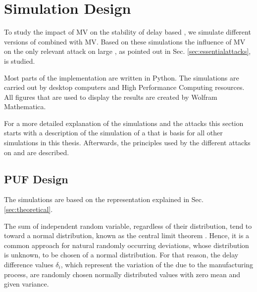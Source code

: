 \chapter{Simulation Design}
\label{cap:simulationdesign}

To study the impact of \ac{MV} on the stability of delay based \pufs, we simulate different versions of \apufs combined with \ac{MV}.
Based on these simulations the influence of \ac{MV} on the only relevant attack on large \xpufs, as pointed out in Sec. \ref{sec:essentialattacks}, is studied.

Most parts of the implementation are written in Python. 
The simulations are carried out by desktop computers and High Performance Computing resources. 
All figures that are used to display the results are created by Wolfram Mathematica.

For a more detailed explanation of the simulations and the attacks this section starts with a description of the simulation of a \apuf that is basis for all other \puf simulations in this thesis.
Afterwards, the principles used by the different attacks on \mpufs and \mxpufs are described.



\section{\ac{PUF} Design}
\label{sec:pufsimulation}

The \apuf simulations are based on the \apuf representation explained in Sec. \ref{sec:theoretical}.

The sum of independent random variable, regardless of their distribution, tend to toward a normal distribution, known as the central limit theorem \cite{Wikipedia2017CentralTheorem}.
Hence, it is a common approach for natural randomly occurring deviations, whose distribution is unknown, to be chosen of a normal distribution.
For that reason, the delay difference values $\delta_i$, which represent the variation of the \apuf due to the manufacturing process, are randomly chosen normally distributed values with zero mean and given variance. %

